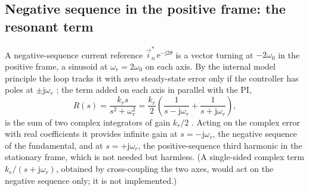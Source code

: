 \documentclass[10pt,a4paper]{scrartcl}
\newcommand{\wo}{\omega_0}
\newcommand{\wres}{\omega_r}
\newcommand{\jj}{\mathrm{j}}
\newcommand{\ee}{\mathrm{e}}
\begin{document}
\begin{onehalfspace}
\subsection{Negative sequence in the positive frame: the resonant term}
\label{sec:resonant}

A negative-sequence current reference $\vec i^*_n\,\ee^{-\jj2\theta}$ is a vector turning at $-2\wo$ in the positive frame, a sinusoid at $\wres = 2\wo$ on each axis. By the internal model principle the loop tracks it with zero steady-state error only if the controller has poles at $\pm\jj\wres$ \cite{zmood2003, teodorescu2006}; the term added on each axis in parallel with the PI,
\begin{equation}
R(s) = \frac{k_r s}{s^2 + \wres^2} = \frac{k_r}{2}\left(\frac{1}{s - \jj\wres} + \frac{1}{s + \jj\wres}\right),
\label{eq:resonant}
\end{equation}
is the sum of two complex integrators of gain $k_r/2$ \cite{liserre2006}. Acting on the complex error with real coefficients it provides infinite gain at $s = -\jj\wres$, the negative sequence of the fundamental, and at $s = +\jj\wres$, the positive-sequence third harmonic in the stationary frame, which is not needed but harmless. (A single-sided complex term $k_r/(s + \jj\wres)$, obtained by cross-coupling the two axes, would act on the negative sequence only; it is not implemented.)


\end{onehalfspace}
\end{document}
